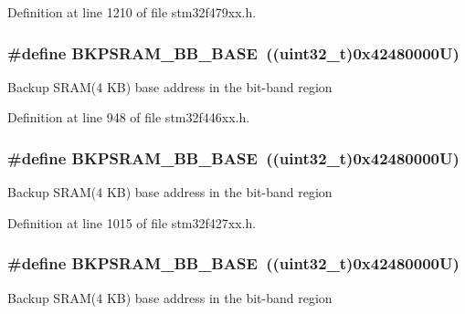 Definition at line 1210 of file stm32f479xx.\+h.

\subsubsection[{\texorpdfstring{B\+K\+P\+S\+R\+A\+M\+\_\+\+B\+B\+\_\+\+B\+A\+SE}{BKPSRAM_BB_BASE}}]{\setlength{\rightskip}{0pt plus 5cm}\#define B\+K\+P\+S\+R\+A\+M\+\_\+\+B\+B\+\_\+\+B\+A\+SE~((uint32\+\_\+t)0x42480000\+U)}\hypertarget{group___peripheral__memory__map_gaee19a30c9fa326bb10b547e4eaf4e250}{}\label{group___peripheral__memory__map_gaee19a30c9fa326bb10b547e4eaf4e250}
Backup S\+R\+A\+M(4 K\+B) base address in the bit-\/band region 

Definition at line 948 of file stm32f446xx.\+h.

\subsubsection[{\texorpdfstring{B\+K\+P\+S\+R\+A\+M\+\_\+\+B\+B\+\_\+\+B\+A\+SE}{BKPSRAM_BB_BASE}}]{\setlength{\rightskip}{0pt plus 5cm}\#define B\+K\+P\+S\+R\+A\+M\+\_\+\+B\+B\+\_\+\+B\+A\+SE~((uint32\+\_\+t)0x42480000\+U)}\hypertarget{group___peripheral__memory__map_gaee19a30c9fa326bb10b547e4eaf4e250}{}\label{group___peripheral__memory__map_gaee19a30c9fa326bb10b547e4eaf4e250}
Backup S\+R\+A\+M(4 K\+B) base address in the bit-\/band region 

Definition at line 1015 of file stm32f427xx.\+h.

\subsubsection[{\texorpdfstring{B\+K\+P\+S\+R\+A\+M\+\_\+\+B\+B\+\_\+\+B\+A\+SE}{BKPSRAM_BB_BASE}}]{\setlength{\rightskip}{0pt plus 5cm}\#define B\+K\+P\+S\+R\+A\+M\+\_\+\+B\+B\+\_\+\+B\+A\+SE~((uint32\+\_\+t)0x42480000\+U)}\hypertarget{group___peripheral__memory__map_gaee19a30c9fa326bb10b547e4eaf4e250}{}\label{group___peripheral__memory__map_gaee19a30c9fa326bb10b547e4eaf4e250}
Backup S\+R\+A\+M(4 K\+B) base address in the bit-\/band region 

